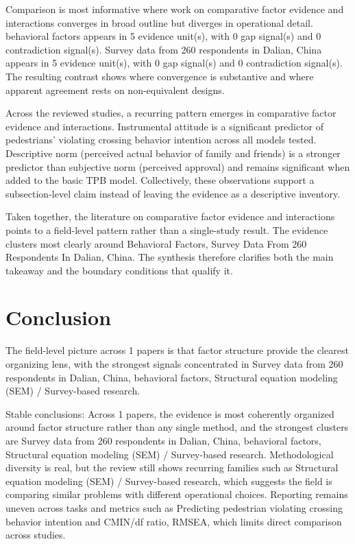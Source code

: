\documentclass{article}
\begin{document}
Comparison is most informative where work on comparative factor evidence and interactions converges in broad outline but diverges in operational detail. behavioral factors appears in 5 evidence unit(s), with 0 gap signal(s) and 0 contradiction signal(s). Survey data from 260 respondents in Dalian, China appears in 5 evidence unit(s), with 0 gap signal(s) and 0 contradiction signal(s). The resulting contrast shows where convergence is substantive and where apparent agreement rests on non-equivalent designs. \cite{08_2016_zhou_aap}

Across the reviewed studies, a recurring pattern emerges in comparative factor evidence and interactions. Instrumental attitude is a significant predictor of pedestrians' violating crossing behavior intention across all models tested. Descriptive norm (perceived actual behavior of family and friends) is a stronger predictor than subjective norm (perceived approval) and remains significant when added to the basic TPB model. Collectively, these observations support a subsection-level claim instead of leaving the evidence as a descriptive inventory. \cite{08_2016_zhou_aap}

Taken together, the literature on comparative factor evidence and interactions points to a field-level pattern rather than a single-study result. The evidence clusters most clearly around Behavioral Factors, Survey Data From 260 Respondents In Dalian, China. The synthesis therefore clarifies both the main takeaway and the boundary conditions that qualify it. \cite{08_2016_zhou_aap}

\section{Conclusion}
The field-level picture across 1 papers is that factor structure provide the clearest organizing lens, with the strongest signals concentrated in Survey data from 260 respondents in Dalian, China, behavioral factors, Structural equation modeling (SEM) / Survey-based research. \cite{08_2016_zhou_aap}

Stable conclusions: Across 1 papers, the evidence is most coherently organized around factor structure rather than any single method, and the strongest clusters are Survey data from 260 respondents in Dalian, China, behavioral factors, Structural equation modeling (SEM) / Survey-based research. Methodological diversity is real, but the review still shows recurring families such as Structural equation modeling (SEM) / Survey-based research, which suggests the field is comparing similar problems with different operational choices. Reporting remains uneven across tasks and metrics such as Predicting pedestrian violating crossing behavior intention and CMIN/df ratio, RMSEA, which limits direct comparison across studies. \cite{08_2016_zhou_aap}
\end{document}
